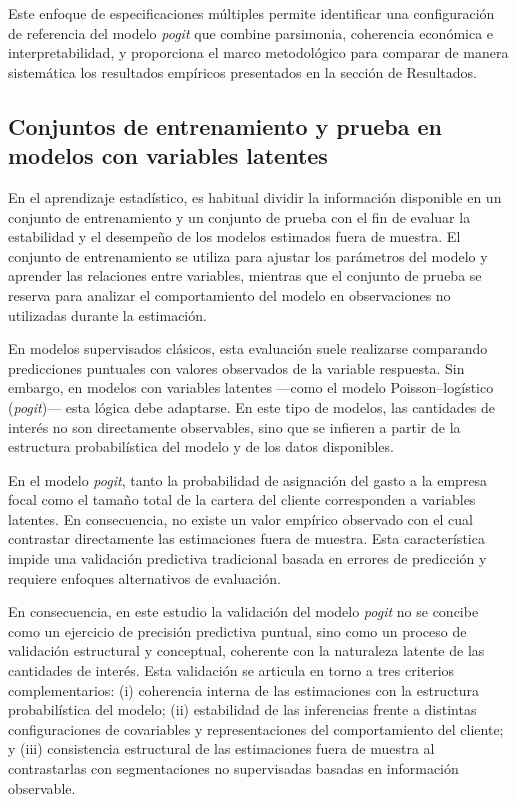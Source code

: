     Este enfoque de especificaciones múltiples permite identificar una configuración de referencia del modelo \emph{pogit} que combine parsimonia, coherencia económica e interpretabilidad, y proporciona el marco metodológico para comparar de manera sistemática los resultados empíricos presentados en la sección de Resultados.


\subsection{Conjuntos de entrenamiento y prueba en modelos con variables latentes}
    En el aprendizaje estadístico, es habitual dividir la información disponible en un conjunto de entrenamiento y un conjunto de prueba con el fin de evaluar la estabilidad y el desempeño de los modelos estimados fuera de muestra. El conjunto de entrenamiento se utiliza para ajustar los parámetros del modelo y aprender las relaciones entre variables, mientras que el conjunto de prueba se reserva para analizar el comportamiento del modelo en observaciones no utilizadas durante la estimación.

    En modelos supervisados clásicos, esta evaluación suele realizarse comparando predicciones puntuales con valores observados de la variable respuesta. Sin embargo, en modelos con variables latentes —como el modelo Poisson--logístico (\emph{pogit})— esta lógica debe adaptarse. En este tipo de modelos, las cantidades de interés no son directamente observables, sino que se infieren a partir de la estructura probabilística del modelo y de los datos disponibles.

    En el modelo \emph{pogit}, tanto la probabilidad de asignación del gasto a la empresa focal como el tamaño total de la cartera del cliente corresponden a variables latentes. En consecuencia, no existe un valor empírico observado con el cual contrastar directamente las estimaciones fuera de muestra. Esta característica impide una validación predictiva tradicional basada en errores de predicción y requiere enfoques alternativos de evaluación.

    En consecuencia, en este estudio la validación del modelo \emph{pogit} no se concibe
    como un ejercicio de precisión predictiva puntual, sino como un proceso de validación
    estructural y conceptual, coherente con la naturaleza latente de las cantidades de
    interés. Esta validación se articula en torno a tres criterios complementarios:
    (i) coherencia interna de las estimaciones con la estructura probabilística del modelo;
    (ii) estabilidad de las inferencias frente a distintas configuraciones de covariables y
    representaciones del comportamiento del cliente; y (iii) consistencia estructural de
    las estimaciones fuera de muestra al contrastarlas con segmentaciones no supervisadas
    basadas en información observable.


